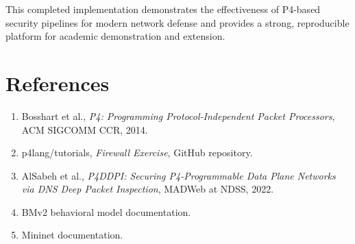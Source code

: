 \documentclass[sigconf,nonacm]{acmart}
\begin{document}
This completed implementation demonstrates the effectiveness of P4-based security
pipelines for modern network defense and provides a strong, reproducible platform
for academic demonstration and extension.

\section*{References}
\begin{enumerate}
  \item Bosshart et al., \textit{P4: Programming Protocol-Independent Packet Processors}, ACM SIGCOMM CCR, 2014.
  \item p4lang/tutorials, \textit{Firewall Exercise}, GitHub repository.
  \item AlSabeh et al., \textit{P4DDPI: Securing P4-Programmable Data Plane Networks via DNS Deep Packet Inspection}, MADWeb at NDSS, 2022.
  \item BMv2 behavioral model documentation.
  \item Mininet documentation.
\end{enumerate}
\end{document}

